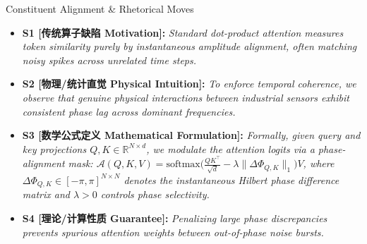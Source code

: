\begin{TipBox}{Constituent Alignment \& Rhetorical Moves}
\begin{itemize}[leftmargin=1.5em]
  \item \textbf{S1 [传统算子缺陷 Motivation]:} \textit{Standard dot-product attention measures token similarity purely by instantaneous amplitude alignment, often matching noisy spikes across unrelated time steps.}\par{}
  \item \textbf{S2 [物理/统计直觉 Physical Intuition]:} \textit{To enforce temporal coherence, we observe that genuine physical interactions between industrial sensors exhibit consistent phase lag across dominant frequencies.}\par{}
  \item \textbf{S3 [数学公式定义 Mathematical Formulation]:} \textit{Formally, given query and key projections $Q, K \in \mathbb{R}^{N \times d}$, we modulate the attention logits via a phase-alignment mask: $\mathcal{A}(Q, K, V) = \text{softmax}\big(\frac{QK^\top}{\sqrt{d}} - \lambda \|\Delta \Phi_{Q,K}\|_1\big)V$, where $\Delta \Phi_{Q,K} \in [-\pi, \pi]^{N \times N}$ denotes the instantaneous Hilbert phase difference matrix and $\lambda > 0$ controls phase selectivity.}\par{}
  \item \textbf{S4 [理论/计算性质 Guarantee]:} \textit{Penalizing large phase discrepancies prevents spurious attention weights between out-of-phase noise bursts.}\par{}
\end{itemize}
\end{TipBox}
\bigskip
